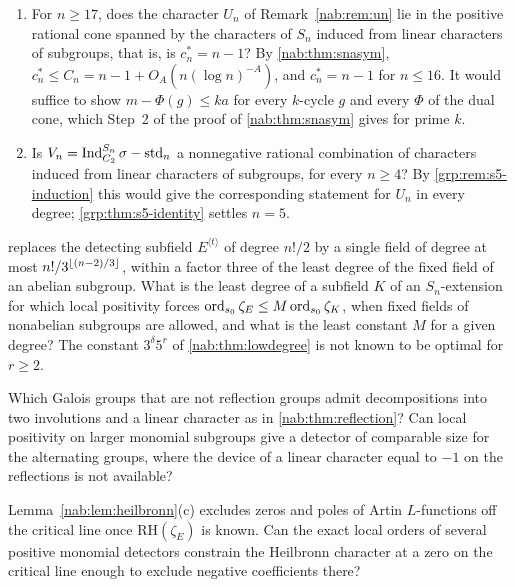 \begin{question}\label{nab:q:un}
\begin{enumerate}[label=\textup{(\alph*)}]
\item For $n\ge17$, does the character $U_n$ of Remark~\ref{nab:rem:un} lie in the positive rational
cone spanned by the characters of $S_n$ induced from linear characters of subgroups, that
is, is $c_n^*=n-1$? By \cref{nab:thm:snasym}, $c_n^*\le C_n=n-1+O_A(n(\log n)^{-A})$, and
$c_n^*=n-1$ for $n\le16$. It would suffice to show $m-\Phi(g)\le ka$ for every $k$-cycle $g$
and every $\Phi$ of the dual cone, which Step~2 of the proof of \cref{nab:thm:snasym} gives
for prime $k$.
\item\label{grp:q:vn} Is $V_n=\operatorname{Ind}_{C_2}^{S_n}\sigma-\mathrm{std}_n$ a nonnegative rational combination
of characters induced from linear characters of subgroups, for every $n\ge4$?
By \cref{grp:rem:s5-induction} this would give the corresponding statement for
$U_n$ in every degree; \cref{grp:thm:s5-identity} settles $n=5$.
\end{enumerate}
\end{question}

\begin{question}\label{nab:q:lowdegree}
 replaces the detecting subfield $E^{\langle t\rangle}$ of degree $n!/2$
by a single field of degree at most $n!/3^{\lfloor(n-2)/3\rfloor}$, within a factor three of the
least degree of the fixed field of an abelian subgroup. What is the least degree of a
subfield $K$ of an $S_n$-extension for which local positivity forces
$\operatorname{ord}_{s_0}\zeta_E\le M\operatorname{ord}_{s_0}\zeta_K$, when fixed fields of nonabelian subgroups are allowed,
and what is the least constant $M$ for a given degree? The constant $3^\delta5^r$ of
\cref{nab:thm:lowdegree} is not known to be optimal for $r\ge2$.
\end{question}

\begin{question}\label{nab:q:nonreflection}
Which Galois groups that are not reflection groups admit decompositions into two
involutions and a linear character as in \cref{nab:thm:reflection}? Can local positivity
on larger monomial subgroups give a detector of comparable size for the alternating
groups, where the device of a linear character equal to $-1$ on the reflections is not
available?
\end{question}

\begin{question}\label{nab:q:line}
Lemma~\ref{nab:lem:heilbronn}(c) excludes zeros and poles of Artin $L$-functions off the
critical line once $\mathrm{RH}(\zeta_E)$ is known. Can the exact local orders of several
positive monomial detectors constrain the Heilbronn character at a zero on the critical
line enough to exclude negative coefficients there?
\end{question}
